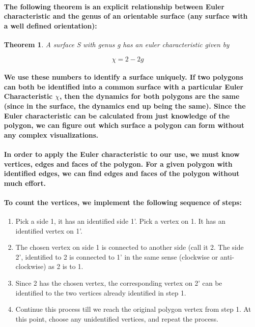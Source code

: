 \documentclass{report}
\newtheorem{theorem}{Theorem}[chapter]
\begin{document}
\paragraph{The following theorem is an explicit relationship between Euler characteristic and the genus of an orientable surface (any surface with a well defined orientation):}

\begin{theorem}
A surface \textit{S} with genus \textit{g} has an euler characteristic given by
\end{theorem}

\begin{equation}
\chi=2-2g
\end{equation}

\paragraph{We use these numbers to identify a surface uniquely. If two polygons can both be identified into a common surface with a particular Euler Characteristic $\chi$, then the dynamics for both polygons are the same (since in the surface, the dynamics end up being the same). Since the Euler characteristic can be calculated from just knowledge of the polygon, we can figure out which surface a polygon can form without any complex visualizations.}

\paragraph{In order to apply the Euler characteristic to our use, we must know vertices, edges and faces of the polygon. For a given polygon with identified edges, we can find edges and faces of the polygon without much effort.}

\paragraph{To count the vertices, we implement the following sequence of steps:}


\begin{enumerate}

\item Pick a side 1, it has an identified side 1’. Pick a vertex on 1. It has an identified vertex on 1’.

\item The chosen vertex on side 1 is connected to another side (call it 2. The side 2’, identified to 2 is connected to 1’ in the same sense (clockwise or anti-clockwise) as 2 is to 1.

\item Since 2 has the chosen vertex, the corresponding vertex on 2’ can be identified to the two vertices already identified in step 1.

\item Continue this process till we reach the original polygon vertex from step 1. At this point, choose any unidentified vertices, and repeat the process.

\end{enumerate}
\end{document}
